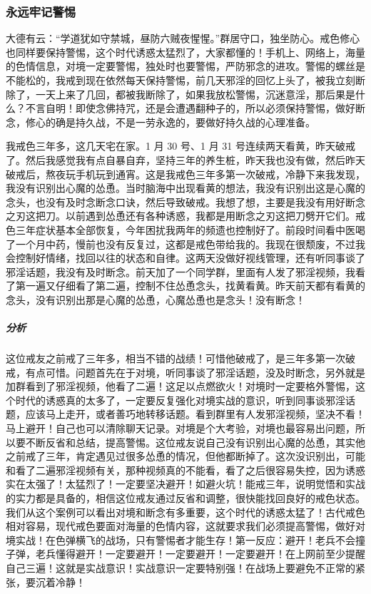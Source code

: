 \subsubsection{永远牢记警惕}

大德有云：“学道犹如守禁城，昼防六贼夜惺惺。”群居守口，独坐防心。戒色修心也同样要保持警惕，这个时代诱惑太猛烈了，大家都懂的！手机上、网络上，海量的色情信息，对境一定要警惕，独处时也要警惕，严防邪念的进攻。警惕的螺丝是不能松的，我戒到现在依然每天保持警惕，前几天邪淫的回忆上头了，被我立刻断除了，一天上来了几回，都被我断除了，如果我放松警惕，沉迷意淫，那后果是什么？不言自明！即使念佛持咒，还是会遭遇翻种子的，所以必须保持警惕，做好断念，修心的确是持久战，不是一劳永逸的，要做好持久战的心理准备。

\begin{case}
    我戒色三年多，这几天宅在家。1 月 30 号、1 月 31 号连续两天看黄，昨天破戒了。然后我感觉我有点自暴自弃，坚持三年的养生桩，昨天我也没有做，然后昨天破戒后，熬夜玩手机玩到通宵。这是我戒色三年多第一次破戒，冷静下来我发现，我没有识别出心魔的怂恿。当时脑海中出现看黄的想法，我没有识别出这是心魔的念头，也没有及时念断念口诀，然后导致破戒。我想了想，主要是我没有用好断念之刃这把刀。以前遇到怂恿还有各种诱惑，我都是用断念之刃这把刀劈开它们。戒色三年症状基本全部恢复，今年困扰我两年的频遗也控制好了。前段时间看中医喝了一个月中药，慢前也没有反复过，这都是戒色带给我的。我现在很颓废，不过我会控制好情绪，找回以往的状态和自律。这两天没做好视线管理，还有听同事谈了邪淫话题，我没有及时断念。前天加了一个同学群，里面有人发了邪淫视频，我看了第一遍又仔细看了第二遍，控制不住怂恿念头，找黄看黄。昨天前天都有看黄的念头，没有识别出那是心魔的怂恿，心魔怂恿也是念头！没有断念！
    \subparagraph{分析} 这位戒友之前戒了三年多，相当不错的战绩！可惜他破戒了，是三年多第一次破戒，有点可惜。问题首先在于对境，听同事谈了邪淫话题，没及时断念，另外就是加群看到了邪淫视频，他看了二遍！这足以点燃欲火！对境时一定要格外警惕，这个时代的诱惑真的太多了，一定要反复强化对境实战的意识，听到同事谈邪淫话题，应该马上走开，或者善巧地转移话题。看到群里有人发邪淫视频，坚决不看！马上避开！自己也可以清除聊天记录。对境是个大考验，对境也最容易出问题，所以要不断反省和总结，提高警惕。这位戒友说自己没有识别出心魔的怂恿，其实他之前戒了三年，肯定遇见过很多怂恿的情况，但他都断掉了。这次没识别出，可能和看了二遍邪淫视频有关，那种视频真的不能看，看了之后很容易失控，因为诱惑实在太强了！太猛烈了！一定要坚决避开！如避火坑！能戒三年，说明觉悟和实战的实力都是具备的，相信这位戒友通过反省和调整，很快能找回良好的戒色状态。我们从这个案例可以看出对境和断念有多重要，这个时代的诱惑太猛了！古代戒色相对容易，现代戒色要面对海量的色情内容，这就要求我们必须提高警惕，做好对境实战！在色弹横飞的战场，只有警惕者才能生存！第一反应：避开！老兵不会撞子弹，老兵懂得避开！一定要避开！一定要避开！一定要避开！在上网前至少提醒自己三遍！这就是实战意识！实战意识一定要特别强！在战场上要避免不正常的紧张，要沉着冷静！
\end{case}

